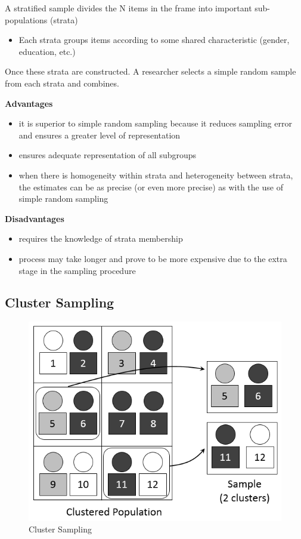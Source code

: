 \documentclass[
]{book}
\providecommand{\tightlist}{%
  \setlength{\itemsep}{0pt}\setlength{\parskip}{0pt}}
\begin{document}
A stratified sample divides the N items in the frame into important sub-populations (strata)

\begin{itemize}
\tightlist
\item
  Each strata groups items according to some shared characteristic (gender, education, etc.)
\end{itemize}

Once these strata are constructed. A researcher selects a simple random sample from each strata and combines.

\textbf{Advantages}

\begin{itemize}
\item
  it is superior to simple random sampling because it reduces sampling error and ensures a greater level of representation
\item
  ensures adequate representation of all subgroups
\item
  when there is homogeneity within strata and heterogeneity between strata, the estimates can be as precise (or even more precise) as with the use of simple random sampling
\end{itemize}

\textbf{Disadvantages}

\begin{itemize}
\item
  requires the knowledge of strata membership
\item
  process may take longer and prove to be more expensive due to the extra stage in the sampling procedure
\end{itemize}

\hypertarget{cluster-sampling}{%
\subsection{Cluster Sampling}\label{cluster-sampling}}

\begin{figure}

{\centering \includegraphics[width=0.5\linewidth]{images/Cluster} 

}

\caption{Cluster Sampling}\label{fig:unnamed-chunk-26}
\end{figure}
\end{document}
